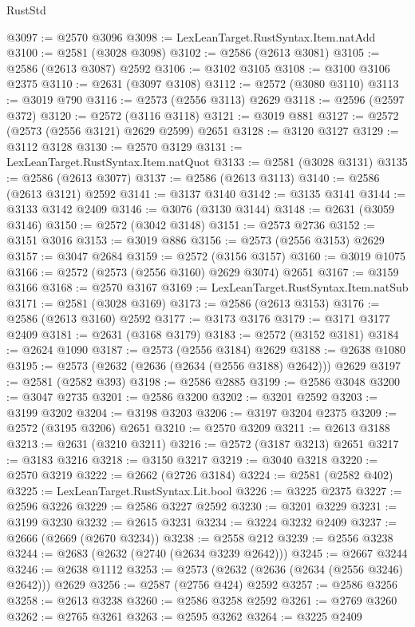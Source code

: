 \begin{lexlean}{RustStd}
\begin{coremodule}
@3097 := @2570 @3096
@3098 := LexLeanTarget.RustSyntax.Item.natAdd
@3100 := @2581 (@3028 @3098)
@3102 := @2586 (@2613 @3081)
@3105 := @2586 (@2613 @3087) @2592
@3106 := @3102 @3105
@3108 := @3100 @3106 @2375
@3110 := @2631 (@3097 @3108)
@3112 := @2572 (@3080 @3110)
@3113 := @3019 @790
@3116 := @2573 (@2556 @3113) @2629
@3118 := @2596 (@2597 @372)
@3120 := @2572 (@3116 @3118)
@3121 := @3019 @881
@3127 := @2572 (@2573 (@2556 @3121) @2629 @2599) @2651
@3128 := @3120 @3127
@3129 := @3112 @3128
@3130 := @2570 @3129
@3131 := LexLeanTarget.RustSyntax.Item.natQuot
@3133 := @2581 (@3028 @3131)
@3135 := @2586 (@2613 @3077)
@3137 := @2586 (@2613 @3113)
@3140 := @2586 (@2613 @3121) @2592
@3141 := @3137 @3140
@3142 := @3135 @3141
@3144 := @3133 @3142 @2409
@3146 := @3076 (@3130 @3144)
@3148 := @2631 (@3059 @3146)
@3150 := @2572 (@3042 @3148)
@3151 := @2573 @2736
@3152 := @3151 @3016
@3153 := @3019 @886
@3156 := @2573 (@2556 @3153) @2629
@3157 := @3047 @2684
@3159 := @2572 (@3156 @3157)
@3160 := @3019 @1075
@3166 := @2572 (@2573 (@2556 @3160) @2629 @3074) @2651
@3167 := @3159 @3166
@3168 := @2570 @3167
@3169 := LexLeanTarget.RustSyntax.Item.natSub
@3171 := @2581 (@3028 @3169)
@3173 := @2586 (@2613 @3153)
@3176 := @2586 (@2613 @3160) @2592
@3177 := @3173 @3176
@3179 := @3171 @3177 @2409
@3181 := @2631 (@3168 @3179)
@3183 := @2572 (@3152 @3181)
@3184 := @2624 @1090
@3187 := @2573 (@2556 @3184) @2629
@3188 := @2638 @1080
@3195 := @2573 (@2632 (@2636 (@2634 (@2556 @3188) @2642))) @2629
@3197 := @2581 (@2582 @393)
@3198 := @2586 @2885
@3199 := @2586 @3048
@3200 := @3047 @2735
@3201 := @2586 @3200
@3202 := @3201 @2592
@3203 := @3199 @3202
@3204 := @3198 @3203
@3206 := @3197 @3204 @2375
@3209 := @2572 (@3195 @3206) @2651
@3210 := @2570 @3209
@3211 := @2613 @3188
@3213 := @2631 (@3210 @3211)
@3216 := @2572 (@3187 @3213) @2651
@3217 := @3183 @3216
@3218 := @3150 @3217
@3219 := @3040 @3218
@3220 := @2570 @3219
@3222 := @2662 (@2726 @3184)
@3224 := @2581 (@2582 @402)
@3225 := LexLeanTarget.RustSyntax.Lit.bool
@3226 := @3225 @2375
@3227 := @2596 @3226
@3229 := @2586 @3227 @2592
@3230 := @3201 @3229
@3231 := @3199 @3230
@3232 := @2615 @3231
@3234 := @3224 @3232 @2409
@3237 := @2666 (@2669 (@2670 @3234))
@3238 := @2558 @212
@3239 := @2556 @3238
@3244 := @2683 (@2632 (@2740 (@2634 @3239 @2642)))
@3245 := @2667 @3244
@3246 := @2638 @1112
@3253 := @2573 (@2632 (@2636 (@2634 (@2556 @3246) @2642))) @2629
@3256 := @2587 (@2756 @424) @2592
@3257 := @2586 @3256
@3258 := @2613 @3238
@3260 := @2586 @3258 @2592
@3261 := @2769 @3260
@3262 := @2765 @3261
@3263 := @2595 @3262
@3264 := @3225 @2409

\end{coremodule}
\end{lexlean}
